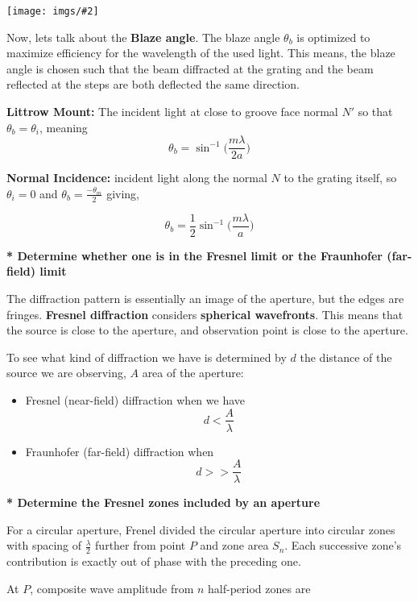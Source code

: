 \documentclass[10pt]{article}
\newcommand*{\pic}[2]{
    \begin{center}
        \texttt{[image: imgs/\#2]}
    \end{center}
}
\newcommand*{\lo}[1]{
    \textbf{* #1} \newline
}
\begin{document}
\newpage

\pic{1}{comparisons.png}

Now, lets talk about the \textbf{Blaze angle}. The blaze angle $\theta_b$ is optimized to maximize efficiency for the wavelength of the used light. This means, the blaze angle is chosen such that the beam diffracted at the grating and the beam reflected at the steps are both deflected the same direction.


\textbf{Littrow Mount:} The incident light at close to groove face normal $N'$ so that $\theta_b = \theta_i$, meaning
\[\theta_b = \sin^{-1}\bigg( \frac{m\lambda}{2a}\bigg)\]

\newblock

\textbf{Normal Incidence:} incident light along the normal $N$ to the grating itself, so $\theta_i = 0$ and $\theta_b = \frac{-\theta_m}{2}$ giving,

\[\theta_b = \frac{1}{2}\sin^{-1}\bigg(\frac{m \lambda}{a}\bigg)\]

\lo{Determine whether one is in the Fresnel limit or the Fraunhofer (far-field) limit}

The diffraction pattern is essentially an image of the aperture, but the edges are fringes. \textbf{Fresnel diffraction} considers \textbf{spherical wavefronts}. This means that the source is close to the aperture, and observation point is close to the aperture.

\newblock

To see what kind of diffraction we have is determined by $d$ the distance of the source we are observing, $A$ area of the aperture:

\begin{itemize}
    \item Fresnel (near-field) diffraction when we have 
    \[d < \frac{A}{\lambda}\]
    \item Fraunhofer (far-field) diffraction when 
    \[d >> \frac{A}{\lambda}\]
\end{itemize}

\newpage

\lo{ Determine the Fresnel zones included by an aperture}

For a circular aperture, Frenel divided the circular aperture into circular zones with spacing of $\frac{\lambda}{2}$ further from point $P$ and zone area $S_n$. Each successive zone's contribution is exactly out of phase with the preceding one.

\newblock

At $P$, composite wave amplitude from $n$ half-period zones are
\end{document}
